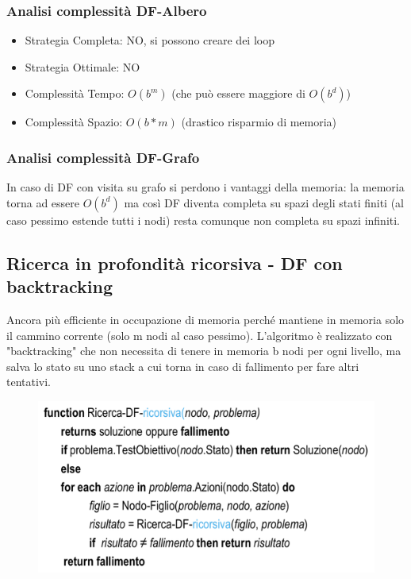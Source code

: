 \documentclass{article}
\begin{document}
\subsubsection{Analisi complessità DF-Albero}
\begin{itemize}
    \item Strategia Completa: NO, si possono creare dei loop
    \item Strategia Ottimale: NO
    \item Complessità Tempo: $O(b^m)$ (che può essere maggiore di $O(b^d)$)
    \item Complessità Spazio: $O(b*m)$ (drastico risparmio di memoria)
\end{itemize}

\subsubsection{Analisi complessità DF-Grafo}
In caso di DF con visita su grafo si perdono i vantaggi della memoria: la memoria torna ad essere $O(b^d)$ ma così DF diventa completa su spazi degli stati finiti (al caso pessimo estende tutti i nodi) resta comunque non completa su spazi infiniti.
\clearpage

\subsection{Ricerca in profondità ricorsiva - DF con backtracking}
Ancora più efficiente in occupazione di memoria perché mantiene in memoria solo il cammino corrente (solo m nodi al caso pessimo). L'algoritmo è realizzato con "backtracking" che non necessita di tenere in memoria b nodi per ogni livello, ma salva lo stato su uno stack a cui torna in caso di fallimento per fare altri tentativi.
\begin{figure}[H]
    \centering
    \includegraphics[scale=0.5]{Images/DFR.png}
\end{figure}
\end{document}
